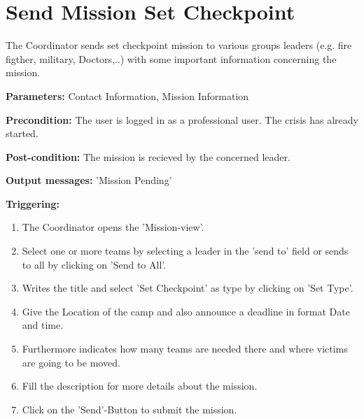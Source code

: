 \section{Send Mission Set Checkpoint}
\label{operation:Checkpoint}
The Coordinator sends set checkpoint mission to various groups leaders (e.g.
fire figther, military, Doctors,..) with some important information concerning the
mission.\\
\begin{description}
\item \textbf{Parameters:} Contact Information, Mission Information
\item \textbf{Precondition:} The user is logged in as a professional user. The
crisis has already started. 
\item \textbf{Post-condition:} The mission is recieved by the concerned leader.
\item \textbf{Output messages:} 'Mission Pending'
\item \textbf{Triggering:}
\begin{enumerate}
\item The Coordinator opens the 'Mission-view'.
\item Select one or more teams by selecting a leader in the 'send to' field or
sends to all by clicking on 'Send to All'.
\item Writes the title and select 'Set Checkpoint' as type by clicking on 'Set
Type'.
\item Give the Location of the camp and also announce a deadline in format Date
and time.
\item Furthermore indicates how many teams are needed there and where victims
are going to be moved.
\item Fill the description for more details about the mission.
\item Click on the 'Send'-Button to submit the mission.
\end{enumerate}
\end{description} 

